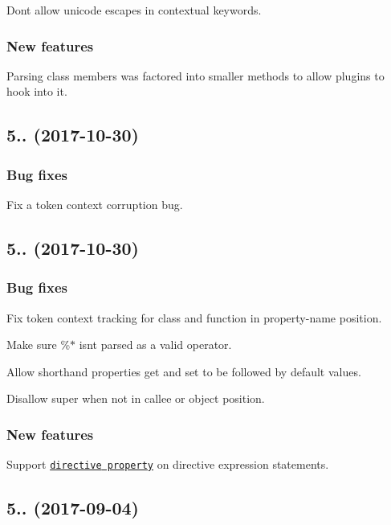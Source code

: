 Don\textquotesingle{}t allow unicode escapes in contextual keywords.

\subsubsection*{New features}

Parsing class members was factored into smaller methods to allow plugins to hook into it.

\subsection*{5.. (2017-\/10-\/30)}

\subsubsection*{Bug fixes}

Fix a token context corruption bug.

\subsection*{5.. (2017-\/10-\/30)}

\subsubsection*{Bug fixes}

Fix token context tracking for {\ttfamily class} and {\ttfamily function} in property-\/name position.

Make sure {\ttfamily \%$\ast$} isn\textquotesingle{}t parsed as a valid operator.

Allow shorthand properties {\ttfamily get} and {\ttfamily set} to be followed by default values.

Disallow {\ttfamily super} when not in callee or object position.

\subsubsection*{New features}

Support \href{https://github.com/estree/estree/compare/b3de58c9997504d6fba04b72f76e6dd1619ee4eb...1da8e603237144f44710360f8feb7a9977e905e0}{\tt {\ttfamily directive} property} on directive expression statements.

\subsection*{5.. (2017-\/09-\/04)}

